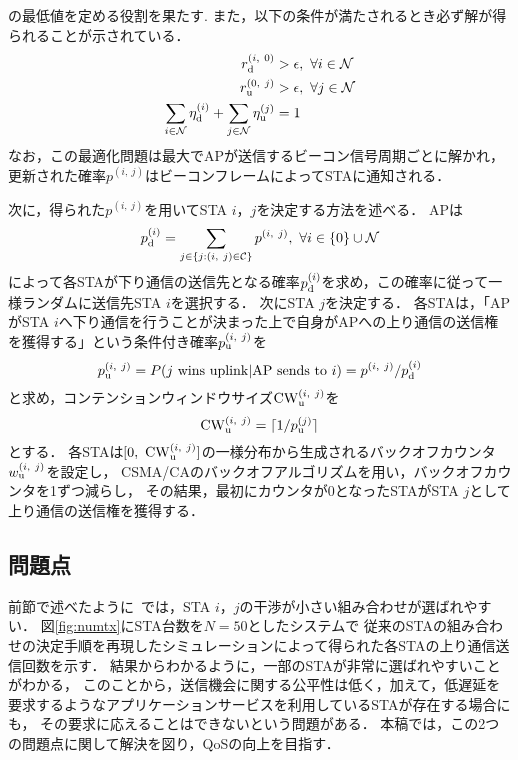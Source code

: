 \documentclass[technicalreport]{ieicej}
\newcommand{\sij}{(i,\ j)}
\newcommand{\mN}{{\mathcal N}}
\newcommand{\pij}{p^{(i,\ j)}}
\begin{document}
		の最低値を定める役割を果たす.
		また，以下の条件が満たされるとき必ず解が得られることが示されている．
		\begin{align}
			r_{\rm d}^{(i,\ 0)} &>\epsilon,\ \forall i\in\mN \\
			r_{\rm u}^{(0,\ j)} &>\epsilon,\ \forall j\in\mN \\
			\sum_{i\in\mN}\eta_{\rm d}^{(i)} + \sum_{j\in\mN}\eta_{\rm u}^{(j)} &=1 \label{eq:feasible}
		\end{align}
		なお，この最適化問題は最大でAPが送信するビーコン信号周期ごとに解かれ，更新された確率$\pij$はビーコンフレームによってSTAに通知される．
		\par
		次に，得られた$\pij$を用いてSTA $i$，$j$を決定する方法を述べる．
		APは
		\begin{equation}
			p_{\rm d}^{(i)}= \sum_{j\in\{j:(i,\ j)\in{\mathcal C}\}}p^{(i,\ j)},\ \forall i \in \{0\}\cup{\mathcal N}
		\end{equation}
		によって各STAが下り通信の送信先となる確率$p_{\rm d}^{(i)}$を求め，この確率に従って一様ランダムに送信先STA $i$を選択する．
		次にSTA $j$を決定する．
		各STAは，「APがSTA $i$へ下り通信を行うことが決まった上で自身がAPへの上り通信の送信権を獲得する」という条件付き確率$p_{\rm u}^{\sij}$を
		\begin{equation}
			p_{\rm u}^{\sij} = P(j\ {\rm wins\ uplink|AP\ sends\ to}\ i)=\pij / p_{\rm d}^{(i)}
		\end{equation}
		と求め，コンテンションウィンドウサイズ${\rm CW}^{\sij}_{\rm u}$を
		\begin{equation}
			{\rm CW}^{\sij}_{\rm u} = \lceil 1/p_{\rm u}^{(j)} \rceil
		\end{equation}
		とする．
		各STAは$[0,\ {\rm CW}^{\sij}_{\rm u}]$の一様分布から生成されるバックオフカウンタ$w_{\rm u}^{\sij}$を設定し，
		CSMA/CAのバックオフアルゴリズムを用い，バックオフカウンタを1ずつ減らし，
		その結果，最初にカウンタが0となったSTAがSTA $j$として上り通信の送信権を獲得する．

	\subsection{問題点}
		前節で述べたように~\cite{promac}では，STA $i$，$j$の干渉が小さい組み合わせが選ばれやすい．
		図\ref{fig:numtx}にSTA台数を$N=50$としたシステムで
		従来のSTAの組み合わせの決定手順を再現したシミュレーションによって得られた各STAの上り通信送信回数を示す．
		結果からわかるように，一部のSTAが非常に選ばれやすいことがわかる，
		このことから，送信機会に関する公平性は低く，加えて，低遅延を要求するようなアプリケーションサービスを利用しているSTAが存在する場合にも，
		その要求に応えることはできないという問題がある．
		本稿では，この2つの問題点に関して解決を図り，QoSの向上を目指す．
\end{document}
